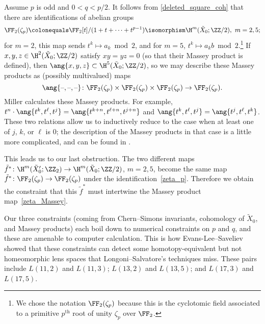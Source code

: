 Assume $p$ is odd and $0 < q < p/2$. It follows from \cref{deleted_square_coh} that there are identifications of
abelian groups
\begin{equation}
\label{zeta_p}
	\FF_2(\zeta_p) \colonequals \FF_2[t]/(1 + t + \cdots + t^{p-1}) \isomorphism \H^m(\tilde X_0;\ZZ/2),\ m = 2,5;
\end{equation}
for $m = 2$, this map sends $t^k\mapsto a_k\bmod 2$, and for $m = 5$, $t^k\mapsto a_kb\bmod 2$.\footnote{We chose
the notation $\FF_2(\zeta_p)$ because this is the cyclotomic field associated to a primitive $p^{\mathrm{th}}$ root
of unity $\zeta_p$ over $\FF_2$.} If $x,y,z\in
\H^2(\tilde X_0;\ZZ/2)$ satisfy $xy = yz = 0$ (so that their Massey product is defined), then $\ang{x,y,z}\subset
\H^5(\tilde X_0;\ZZ/2)$, so we may describe these Massey products as (possibly multivalued) maps
\begin{equation}
\label{zeta_Massey}
	\ang{\text{--}, \text{--}, \text{--}}\colon \FF_2(\zeta_p)\times\FF_2(\zeta_p)\times\FF_2(\zeta_p)\to
	\FF_2(\zeta_p).
\end{equation}
Miller \cite[Theorem 3.33]{Mil11} calculates these Massey products. For example, $t^n\cdot \ang{t^k,t^\ell, t^j} =
\ang{t^{k+n}, t^{\ell+n}, t^{j+n}}$ and $\ang{t^k, t^\ell, t^j} = \ang{t^j, t^\ell, t^k}$. These two relations
allow us to inductively reduce to the case when at least one of $j$, $k$, or $\ell$ is $0$; the description of the
Massey products in that case is a little more complicated, and can be found in \cite[Theorem 7.1]{deletedsquare}.

This leads us to our last obstruction. The two different maps $\tilde f^*\colon \H^m(\tilde
X_0';\ZZ_2)\to\H^m(\tilde X_0;\ZZ/2)$, $m = 2,5$, become the same map $\tilde f^*\colon
\FF_2(\zeta_p)\to\FF_2(\zeta_p)$ under the identification~\eqref{zeta_p}. Therefore we obtain the constraint that
this $\tilde f^*$ must intertwine the Massey product map~\eqref{zeta_Massey}.

Our three constraints (coming from Chern--Simons invariants, cohomology of $\tilde X_0$, and Massey products) each
boil down to numerical constraints on $p$ and $q$, and these are amenable to computer calculation. This is how
Evans-Lee--Saveliev showed that these constraints can detect some homotopy-equivalent but not homeomorphic lens
spaces that Longoni--Salvatore's techniques miss. These pairs include $L(11, 2)$ and $L(11, 3)$; $L(13, 2)$ and
$L(13, 5)$; and $L(17, 3)$ and $L(17, 5)$.
